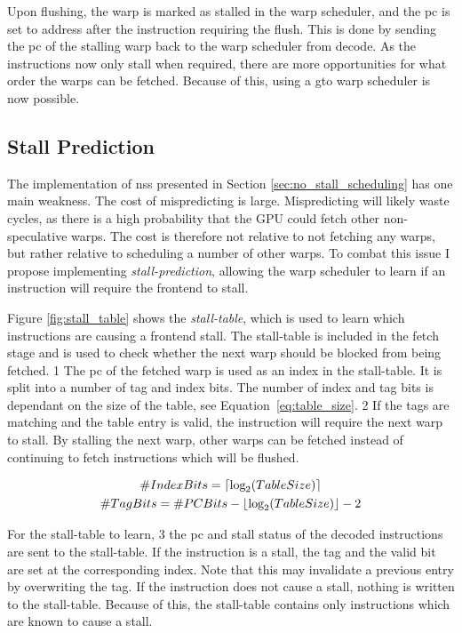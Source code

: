 Upon flushing, the warp is marked as stalled in the warp scheduler, and the \acrshort{pc} is set to address after the instruction requiring the flush. This is done by sending the \acrshort{pc} of the stalling warp back to the warp scheduler from decode. As the instructions now only stall when required, there are more opportunities for what order the warps can be fetched. Because of this, using a \acrshort{gto} warp scheduler is now possible. 

\subsection{Stall Prediction}

The implementation of \acrshort{nss} presented in Section \ref{sec:no_stall_scheduling} has one main weakness. The cost of mispredicting is large. Mispredicting will likely waste cycles, as there is a high probability that the GPU could fetch other non-speculative warps. The cost is therefore not relative to not fetching any warps, but rather relative to scheduling a number of other warps. To combat this issue I propose implementing \textit{stall-prediction}, allowing the warp scheduler to learn if an instruction will require the frontend to stall.

Figure \ref{fig:stall_table} shows the \textit{stall-table}, which is used to learn which instructions are causing a frontend stall. The stall-table is included in the fetch stage and is used to check whether the next warp should be blocked from being fetched. \textcircled{\small{1}} The \acrshort{pc} of the fetched warp is used as an index in the stall-table. It is split into a number of tag and index bits. The number of index and tag bits is dependant on the size of the table, see Equation~\ref{eq:table_size}. \textcircled{\small{2}} If the tags are matching and the table entry is valid, the instruction will require the next warp to stall. By stalling the next warp, other warps can be fetched instead of continuing to fetch instructions which will be flushed.

\begin{equation} \label{eq:table_size}
\begin{gathered}
    \#IndexBits = \ceil*{\text{log}_2(TableSize)} \\
    \#TagBits = \#PCBits - \floor*{\text{log}_2(TableSize)} - 2
\end{gathered}
\end{equation}

For the stall-table to learn, \textcircled{\small{3}} the \acrshort{pc} and stall status of the decoded instructions are sent to the stall-table. If the instruction is a stall, the tag and the valid bit are set at the corresponding index. Note that this may invalidate a previous entry by overwriting the tag. If the instruction does not cause a stall, nothing is written to the stall-table. Because of this, the stall-table contains only instructions which are known to cause a stall.

